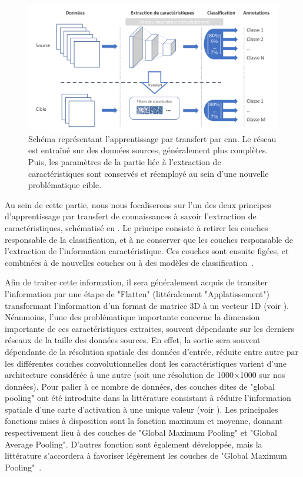 \begin{figure}[H]
    \centering
    \includegraphics[width=\linewidth]{contents/chapter_4/resources/scheme_transfer_learning.pdf}
    \caption{Schéma représentant l'apprentissage par transfert par \gls{cnn}. Le réseau est entraîné sur des données sources, généralement plus complètes. Puis, les paramètres de la partie liée à l'extraction de caractéristiques sont conservés et réemployé au sein d'une nouvelle problématique cible.}
    \label{fig:scheme_transfer_learning}
\end{figure}\par

Au sein de cette partie, nous nous focaliserons sur l'un des deux principes d'apprentissage par transfert de connaissances à savoir l'extraction de caractéristiques, schématisé en . Le principe consiste à retirer les couches responsable de la classification, et à ne conserver que les couches responsable de l'extraction de l'information caractéristique. Ces couches sont ensuite figées, et combinées à de nouvelles couches ou à des modèles de classification~\cite{Litjens2017}.\par 

Afin de traiter cette information, il sera généralement acquis de transiter l'information par une étape de "Flatten" (littéralement "Applatissement") transformant l'information d'un format  de matrice 3D à un vecteur 1D (voir ). Néanmoins, l'une des problématique importante concerne la dimension importante de ces caractéristiques extraites, souvent dépendante sur les derniers réseaux de la taille des données sources. En effet, la sortie sera souvent dépendante de la résolution spatiale des données d'entrée, réduite entre autre par les différentes couches convolutionnelles dont les caractéristiques varient d'une architecture considérée à une autre (soit une résolution de 1000$\times$1000 sur nos données). Pour palier à ce nombre de données, des couches dites de "global pooling" ont été introduite dans la littérature consistant à réduire l'information spatiale d'une carte d'activation à une unique valeur (voir ). Les principales fonctions mises à disposition sont la fonction maximum et moyenne, donnant respectivement lieu à des couches de "Global Maximum Pooling" et "Global Average Pooling". D'autres fonction sont également développée, mais la littérature s'accordera à favoriser légèrement les couches de "Global Maximum Pooling"~\cite{christlein2019}.\par

